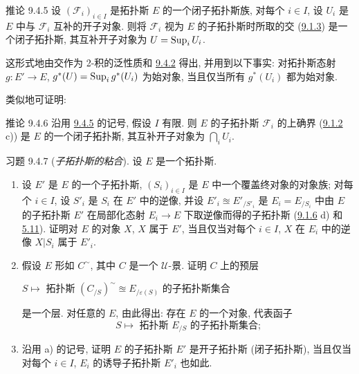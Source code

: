 \begin{enonce*}{推论 9.4.5}
设 $(\mathcal{F}_i)_{i\in I}$ 是拓扑斯 $E$ 的一个闭子拓扑斯族,
对每个 $i\in I$, 设 $U_i$ 是 $E$ 中与 $\mathcal{F}_i$ 互补的开子对象.
则将 $\mathcal{F}_i$ 视为 $E$ 的子拓扑斯时所取的交
(\hyperref[IV.prop9.1.3]{9.1.3}) 是一个闭子拓扑斯,
其互补开子对象为 $U=\operatorname{Sup}_iU_i$.
\end{enonce*}

这形式地由交作为 2-积的泛性质和 \hyperref[IV.prop9.4.2]{9.4.2} 得出,
并用到以下事实:
对拓扑斯态射 $g:E'\rightarrow E$,
$g^{\ast}(U)=\operatorname{Sup}_i g^{\ast}(U_i)$ 为始对象,
当且仅当所有 $g^{\ast}(U_i)$ 都为始对象.

类似地可证明:

\begin{enonce*}{推论 9.4.6}
沿用 \hyperref[IV.cor9.4.5]{9.4.5} 的记号,
假设 $I$ 有限.
则 $E$ 的子拓扑斯 $\mathcal{F}_i$ 的上确界\pageoriginale
{\rm(\hyperref[IV.rem9.1.2]{9.1.2} c))}
是 $E$ 的一个闭子拓扑斯, 其互补开子对象为 $\bigcap_iU_i$.
\end{enonce*}




\begin{enonce*}[remark]{习题 9.4.7}
(\emph{子拓扑斯的粘合}). 设 $E$ 是一个拓扑斯.
\begin{enumerate}
\renewcommand{\theenumi}{\alph{enumi}}
\renewcommand{\labelenumi}{\theenumi)}
\item 设 $E'$ 是 $E$ 的一个子拓扑斯,
$(S_i)_{i\in I}$ 是 $E$ 中一个覆盖终对象的对象族;
对每个 $i\in I$, 设 $S'_i$ 是 $S_i$ 在 $E'$ 中的逆像,
并设 $E'_i\approxeq E'_{/S'_i}$ 是
$E_i=E_{/S_i}$ 中由 $E$ 的子拓扑斯 $E'$
在局部化态射 $E_i\rightarrow E$ 下取逆像而得的子拓扑斯
(\hyperref[IV.exer9.1.6]{9.1.6} d) 和 \hyperref[IV.prop5.11]{5.11}).
证明对 $E$ 的对象 $X$, $X$ 属于 $E'$,
当且仅当对每个 $i\in I$, $X$ 在 $E_i$ 中的逆像 $X| S_i$ 属于 $E'_i$.

\item 假设 $E$ 形如 $C^{\sim}$, 其中 $C$ 是一个 $𝒰$-景.
证明 $C$ 上的预层
\begin{center}
$S\mapsto$ 拓扑斯 $(C_{/S})^{\sim}\approxeq E_{/\varepsilon(S)}$ 的子拓扑斯集合
\end{center}
是一个层. 对任意的 $E$, 由此得出:
存在 $E$ 的一个对象, 代表函子
$$
\text{$S\mapsto$ 拓扑斯 $E_{/S}$ 的子拓扑斯集合;}
$$

\item 沿用 a) 的记号,
证明 $E$ 的子拓扑斯 $E'$ 是开子拓扑斯 (\resp 闭子拓扑斯),
当且仅当对每个 $i\in I$,
$E_i$ 的诱导子拓扑斯 $E'_i$ 也如此.
\end{enumerate}
\end{enonce*}

